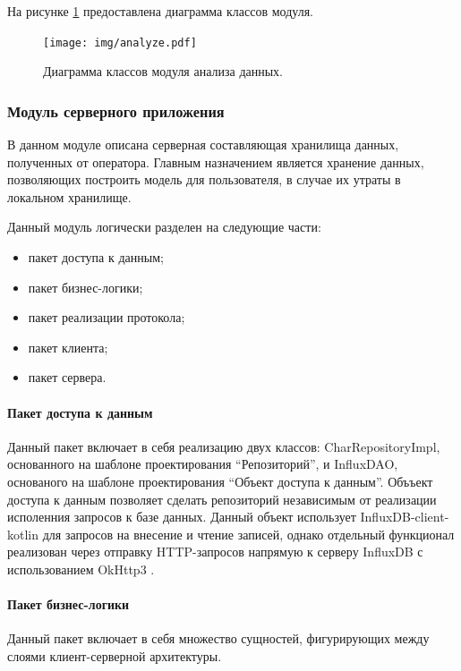 \pagebreak
На рисунке \ref{fig:analyzerUml} предоставлена диаграмма классов модуля.

\begin{figure}[H]
	\centering
	\texttt{[image: img/analyze.pdf]}
	\caption{Диаграмма классов модуля анализа данных.}
	\label{fig:analyzerUml}
\end{figure}

\subsubsection{Модуль серверного приложения}
В данном модуле описана серверная составляющая хранилища данных, полученных от оператора. Главным назначением является хранение данных, позволяющих построить модель для пользователя, в случае их утраты в локальном хранилище.

Данный модуль логически разделен на следующие части:

\begin{itemize}[leftmargin=1.6\parindent]
\item пакет доступа к данным;
\item пакет бизнес-логики;
\item пакет реализации протокола;
\item пакет клиента;
\item пакет сервера.
\end{itemize}

\paragraph{Пакет доступа к данным \newline}
Данный пакет включает в себя реализацию двух классов: CharRepositoryImpl, основанного на шаблоне проектирования ``Репозиторий'', и InfluxDAO, основаного на шаблоне проектирования ``Объект доступа к данным''. Объъект доступа к данным позволяет сделать репозиторий независимым от реализации исполенния запросов к базе данных. Данный объект использует InfluxDB-client-kotlin \cite{influxClientKotlin} для запросов на внесение и чтение записей, однако отдельный функционал реализован через отправку HTTP-запросов напрямую к серверу InfluxDB с использованием OkHttp3 \cite{OkHttp}.

\paragraph{Пакет бизнес-логики \newline}
Данный пакет включает в себя множество сущностей, фигурирующих между слоями клиент-серверной архитектуры.

